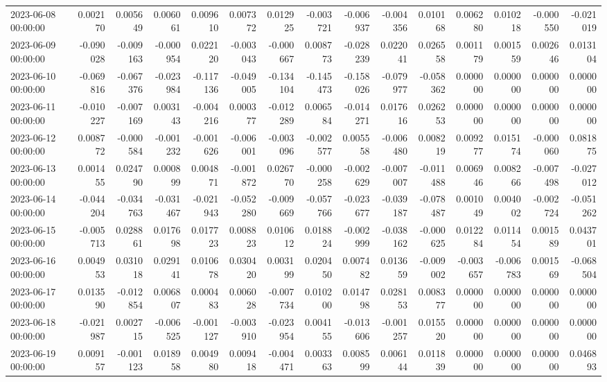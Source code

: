 \begin{tabular}{lrrrrrrrrrrrrrr}
2023-06-08 00:00:00 & 0.002170 & 0.005649 & 0.006061 & 0.009610 & 0.007372 & 0.012925 & -0.003721 & -0.006937 & -0.004356 & 0.010168 & 0.006280 & 0.010218 & -0.000550 & -0.021019 \\
2023-06-09 00:00:00 & -0.090028 & -0.009163 & -0.000954 & 0.022120 & -0.003043 & -0.000667 & 0.008773 & -0.028239 & 0.022041 & 0.026558 & 0.001179 & 0.001559 & 0.002646 & 0.013104 \\
2023-06-10 00:00:00 & -0.069816 & -0.067376 & -0.023984 & -0.117136 & -0.049005 & -0.134104 & -0.145473 & -0.158026 & -0.079977 & -0.058362 & 0.000000 & 0.000000 & 0.000000 & 0.000000 \\
2023-06-11 00:00:00 & -0.010227 & -0.007169 & 0.003143 & -0.004216 & 0.000377 & -0.012289 & 0.006584 & -0.014271 & 0.017616 & 0.026253 & 0.000000 & 0.000000 & 0.000000 & 0.000000 \\
2023-06-12 00:00:00 & 0.008772 & -0.000584 & -0.001232 & -0.001626 & -0.006001 & -0.003096 & -0.002577 & 0.005558 & -0.006480 & 0.008219 & 0.009277 & 0.015174 & -0.000060 & 0.081875 \\
2023-06-13 00:00:00 & 0.001455 & 0.024790 & 0.000899 & 0.004871 & -0.001872 & 0.026770 & -0.000258 & -0.002629 & -0.007007 & -0.011488 & 0.006946 & 0.008266 & -0.007498 & -0.027012 \\
2023-06-14 00:00:00 & -0.044204 & -0.034763 & -0.031467 & -0.021943 & -0.052280 & -0.009669 & -0.057766 & -0.023677 & -0.039187 & -0.078487 & 0.001049 & 0.004002 & -0.002724 & -0.051262 \\
2023-06-15 00:00:00 & -0.005713 & 0.028861 & 0.017698 & 0.017723 & 0.008823 & 0.010612 & 0.018824 & -0.002999 & -0.038162 & -0.000625 & 0.012284 & 0.011454 & 0.001589 & 0.043701 \\
2023-06-16 00:00:00 & 0.004953 & 0.031018 & 0.029141 & 0.010678 & 0.030420 & 0.003199 & 0.020450 & 0.007482 & 0.013659 & -0.009002 & -0.003657 & -0.006783 & 0.001569 & -0.068504 \\
2023-06-17 00:00:00 & 0.013590 & -0.012854 & 0.006807 & 0.000483 & 0.006028 & -0.007734 & 0.010200 & 0.014798 & 0.028153 & 0.008377 & 0.000000 & 0.000000 & 0.000000 & 0.000000 \\
2023-06-18 00:00:00 & -0.021987 & 0.002715 & -0.006525 & -0.001127 & -0.003910 & -0.023954 & 0.004155 & -0.013606 & -0.001257 & 0.015520 & 0.000000 & 0.000000 & 0.000000 & 0.000000 \\
2023-06-19 00:00:00 & 0.009157 & -0.001123 & 0.018958 & 0.004980 & 0.009418 & -0.004471 & 0.003363 & 0.008599 & 0.006144 & 0.011839 & 0.000000 & 0.000000 & 0.000000 & 0.046893 \\

\end{tabular}

